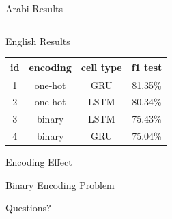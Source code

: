 \documentclass[10pt]{beamer}
\begin{document}
\begin{frame}[fragile]{Arabi Results}
\begin{center}
\begin{tabular}{c c c c c c c}
     \bottomrule
 \end{tabular}
\end{center}

\end{frame}

\begin{frame}[fragile]{English Results}
\begin{center}
 \begin{tabular}{c c c c} 
     \toprule
     \textbf{id} & \textbf{encoding } & \textbf{cell type} & \textbf{f1 test}\\
     \midrule
     1 & one-hot & GRU  & 81.35\%\\ %
     2 & one-hot & LSTM & 80.34\%\\ %
     3 & binary  & LSTM & 75.43\%\\ %
     4 & binary  & GRU  & 75.04\%\\ %

     \bottomrule
 \end{tabular}
\end{center}

\end{frame}




\begin{frame}[fragile]{Encoding Effect}
    \begin{center}
        
    \end{center}
\end{frame}




\begin{frame}[fragile]{Binary Encoding Problem}
    \begin{center}
    
    \end{center}
\end{frame}






{
\begin{frame}[standout]
  Questions?
\end{frame}
}
\end{document}
